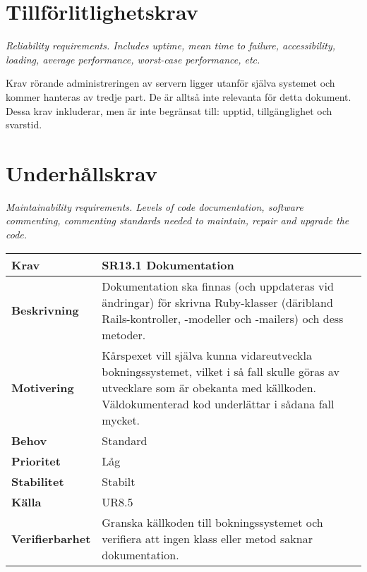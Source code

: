 \documentclass[a4paper, twoside, 11pt, titlepage]{article}
\begin{document}
\clearpage
\section{Tillförlitlighetskrav}


\emph{Reliability requirements. Includes uptime, mean time to failure, accessibility, loading, average performance, worst-case performance, etc.}

Krav rörande administreringen av servern ligger utanför själva systemet och kommer hanteras av tredje part. De är alltså inte relevanta för detta dokument. Dessa krav inkluderar, men är inte begränsat till: upptid, tillgänglighet och svarstid.

\clearpage
\section{Underhållskrav}


\emph{Maintainability requirements. Levels of code documentation, software commenting, commenting standards needed to maintain, repair and upgrade the code.}

\begin{tabular} { p{2.6cm} p{12.5cm} }
	\hline
	\sffamily\textbf{Krav} & \sffamily\textbf{SR13.1 Dokumentation } \\
	\hline
	\sffamily\textbf{Beskrivning} & Dokumentation ska finnas (och uppdateras vid ändringar) för skrivna Ruby-klasser (däribland Rails-kontroller, -modeller och -mailers) och dess metoder.  \\
	\hline
	\sffamily\textbf{Motivering} & Kårspexet vill själva kunna vidareutveckla bokningssystemet, vilket i så fall skulle göras av utvecklare som är obekanta med källkoden. Väldokumenterad kod underlättar i sådana fall mycket.  \\
	\hline
	\sffamily\textbf{Behov} & Standard  \\
	\hline
	\sffamily\textbf{Prioritet} & Låg  \\
	\hline
	\sffamily\textbf{Stabilitet} & Stabilt  \\
	\hline
	\sffamily\textbf{Källa} & UR8.5  \\
	\hline
	\sffamily\textbf{Verifierbarhet} & Granska källkoden till bokningssystemet och verifiera att ingen  klass eller metod saknar dokumentation.  \\
	\hline
\end{tabular}
\vspace{6mm}
\end{document}
